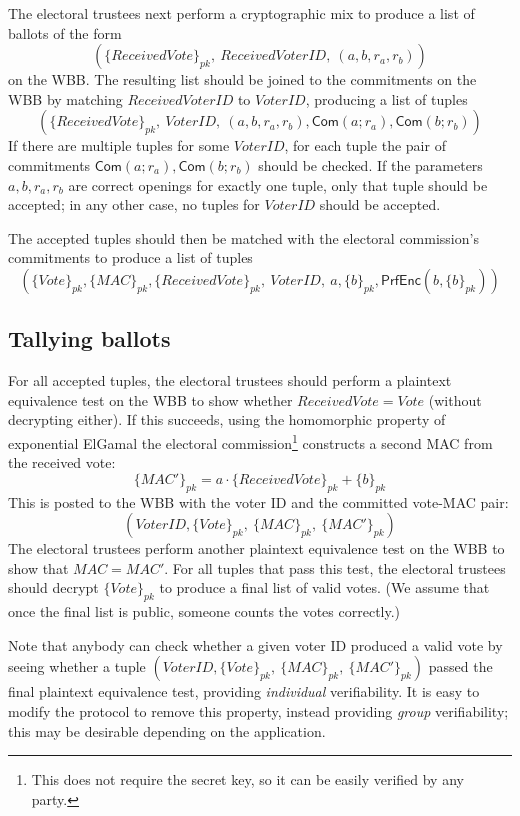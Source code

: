 \documentclass[11pt,twoside,a4paper]{article}
\newcommand{\commit}{\mathsf{Com}}
\newcommand{\PrfEnc}{\mathsf{PrfEnc}}
\theoremstyle{definition}
\newcommand{\Vote}{\mathit{Vote}}
\newcommand{\VoterID}{\mathit{VoterID}}
\newcommand{\Mac}{\mathit{MAC}}
\begin{document}
The electoral trustees next perform a cryptographic mix to produce a list of ballots of the form
\[\left(\{ReceivedVote\}_{pk},\ ReceivedVoterID,\ (a,b,r_a,r_b)\right)\]
on the WBB. The resulting list should be joined to the commitments on the WBB by matching \(ReceivedVoterID\) to \(\VoterID\), producing a list of tuples
\[\left(\{ReceivedVote\}_{pk},\ \VoterID,\ (a,b,r_a,r_b), \commit(a;r_a), \commit(b;r_b)\right)\]
If there are multiple tuples for some \(\VoterID\), for each tuple the pair of commitments \(\commit(a;r_a), \commit(b;r_b)\) should be checked. If the parameters \(a,b,r_a,r_b\) are correct openings for exactly one tuple, only that tuple should be accepted; in any other case, no tuples for \(\VoterID\) should be accepted.

The accepted tuples should then be matched with the electoral commission's commitments to produce a list of tuples
\[\left(\{\Vote\}_{pk},\{\Mac\}_{pk}, \{ReceivedVote\}_{pk},\ \VoterID,\ a, \{b\}_{pk}, \PrfEnc(b, \{b\}_{pk})\right)\]
\subsection{Tallying ballots}
For all accepted tuples, the electoral trustees should perform a plaintext equivalence test on the WBB to show whether \(ReceivedVote=\Vote\) (without decrypting either). If this succeeds, using the homomorphic property of exponential ElGamal the electoral commission\footnote{This does not require the secret key, so it can be easily verified by any party.} constructs a second MAC from the received vote:
\[\{\Mac'\}_{pk}=a\cdot\{ReceivedVote\}_{pk}+\{b\}_{pk}\]
This is posted to the WBB with the voter ID and the committed vote-MAC pair:
\[\left(\VoterID, \{\Vote\}_{pk},\ \{\Mac\}_{pk},\ \{\Mac'\}_{pk}\right)\]
The electoral trustees perform another plaintext equivalence test on the WBB to show that \(\Mac=\Mac'\). For all tuples that pass this test, the electoral trustees should decrypt \(\{\Vote\}_{pk}\) to produce a final list of valid votes. (We assume that once the final list is public, someone counts the votes correctly.)

Note that anybody can check whether a given voter ID produced a valid vote by seeing whether a tuple \(\left(\VoterID, \{\Vote\}_{pk},\ \{\Mac\}_{pk},\ \{\Mac'\}_{pk}\right)\) passed the final plaintext equivalence test, providing \textit{individual} verifiability. It is easy to modify the protocol to remove this property, instead providing \textit{group} verifiability; this may be desirable depending on the application.
\end{document}
